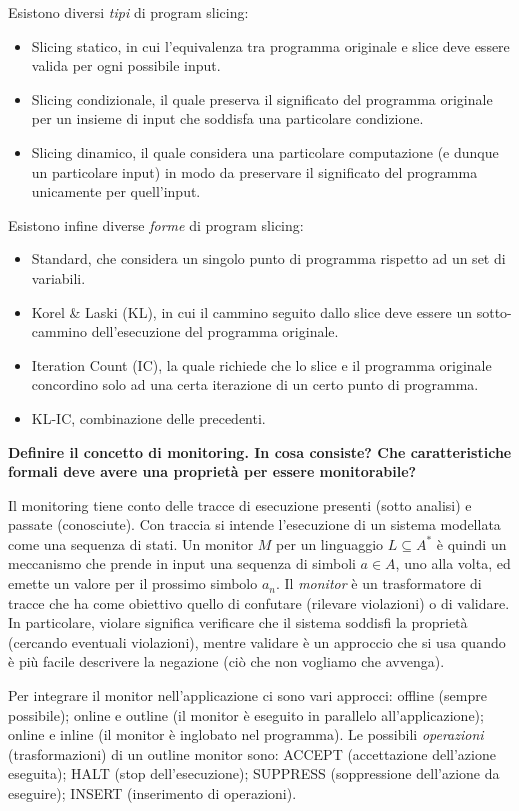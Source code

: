 \documentclass[a4paper,oneside,titlepage]{book}
\begin{document}
Esistono diversi \textit{tipi} di program slicing:
\begin{itemize}
	\item Slicing statico, in cui l'equivalenza tra programma originale e slice deve essere valida per ogni possibile input.
	\item Slicing condizionale, il quale preserva il significato del programma originale per un insieme di input che soddisfa una particolare condizione.
	\item Slicing dinamico, il quale considera una particolare computazione (e dunque un particolare input) in modo da preservare il significato del programma unicamente per quell'input.
\end{itemize}

Esistono infine diverse \textit{forme} di program slicing:
\begin{itemize}
    \item Standard, che considera un singolo punto di programma rispetto ad un set di variabili.
	\item Korel \& Laski (KL), in cui il cammino seguito dallo slice deve essere un sotto-cammino dell'esecuzione del programma originale.
	\item Iteration Count (IC), la quale richiede che lo slice e il programma originale concordino solo ad una certa iterazione di un certo punto di programma.
	\item KL-IC, combinazione delle precedenti.
\end{itemize}
\noindent
\textbf{Definire il concetto di monitoring. In cosa consiste? Che caratteristiche formali deve avere una proprietà per essere monitorabile?}

Il monitoring tiene conto delle tracce di esecuzione presenti (sotto analisi) e passate (conosciute). Con traccia si intende l’esecuzione di un sistema modellata come una sequenza di stati. Un monitor $M$ per un linguaggio $L \subseteq A^\ast$ è quindi un meccanismo che prende in input una sequenza di simboli $a \in A$, uno alla volta, ed emette un valore per il prossimo simbolo $a_n$. Il \textit{monitor} è un trasformatore di tracce che ha come obiettivo quello di confutare (rilevare violazioni) o di validare. In particolare, violare significa verificare che il sistema soddisfi la proprietà (cercando eventuali violazioni), mentre validare è un approccio che si usa quando è più facile descrivere la negazione (ciò che non vogliamo che avvenga).

Per integrare il monitor nell'applicazione ci sono vari approcci: offline (sempre possibile); online e outline (il monitor è eseguito in parallelo all'applicazione); online e inline (il monitor è inglobato nel programma). Le possibili \textit{operazioni} (trasformazioni) di un outline monitor sono: ACCEPT (accettazione dell'azione eseguita); HALT (stop dell'esecuzione); SUPPRESS (soppressione dell'azione da eseguire); INSERT (inserimento di operazioni).
\end{document}
